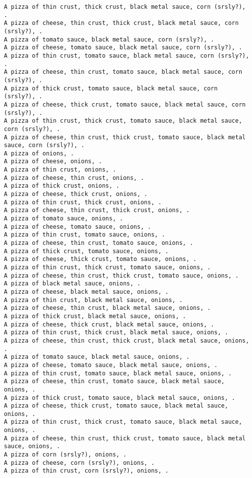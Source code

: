 \documentclass[11pt]{article}
\begin{document}
\begin{enumerate}
\begin{verbatim}
A pizza of thin crust, thick crust, black metal sauce, corn (srsly?), .
A pizza of cheese, thin crust, thick crust, black metal sauce, corn (srsly?), .
A pizza of tomato sauce, black metal sauce, corn (srsly?), .
A pizza of cheese, tomato sauce, black metal sauce, corn (srsly?), .
A pizza of thin crust, tomato sauce, black metal sauce, corn (srsly?), .
A pizza of cheese, thin crust, tomato sauce, black metal sauce, corn (srsly?), .
A pizza of thick crust, tomato sauce, black metal sauce, corn (srsly?), .
A pizza of cheese, thick crust, tomato sauce, black metal sauce, corn (srsly?), .
A pizza of thin crust, thick crust, tomato sauce, black metal sauce, corn (srsly?), .
A pizza of cheese, thin crust, thick crust, tomato sauce, black metal sauce, corn (srsly?), .
A pizza of onions, .
A pizza of cheese, onions, .
A pizza of thin crust, onions, .
A pizza of cheese, thin crust, onions, .
A pizza of thick crust, onions, .
A pizza of cheese, thick crust, onions, .
A pizza of thin crust, thick crust, onions, .
A pizza of cheese, thin crust, thick crust, onions, .
A pizza of tomato sauce, onions, .
A pizza of cheese, tomato sauce, onions, .
A pizza of thin crust, tomato sauce, onions, .
A pizza of cheese, thin crust, tomato sauce, onions, .
A pizza of thick crust, tomato sauce, onions, .
A pizza of cheese, thick crust, tomato sauce, onions, .
A pizza of thin crust, thick crust, tomato sauce, onions, .
A pizza of cheese, thin crust, thick crust, tomato sauce, onions, .
A pizza of black metal sauce, onions, .
A pizza of cheese, black metal sauce, onions, .
A pizza of thin crust, black metal sauce, onions, .
A pizza of cheese, thin crust, black metal sauce, onions, .
A pizza of thick crust, black metal sauce, onions, .
A pizza of cheese, thick crust, black metal sauce, onions, .
A pizza of thin crust, thick crust, black metal sauce, onions, .
A pizza of cheese, thin crust, thick crust, black metal sauce, onions, .
A pizza of tomato sauce, black metal sauce, onions, .
A pizza of cheese, tomato sauce, black metal sauce, onions, .
A pizza of thin crust, tomato sauce, black metal sauce, onions, .
A pizza of cheese, thin crust, tomato sauce, black metal sauce, onions, .
A pizza of thick crust, tomato sauce, black metal sauce, onions, .
A pizza of cheese, thick crust, tomato sauce, black metal sauce, onions, .
A pizza of thin crust, thick crust, tomato sauce, black metal sauce, onions, .
A pizza of cheese, thin crust, thick crust, tomato sauce, black metal sauce, onions, .
A pizza of corn (srsly?), onions, .
A pizza of cheese, corn (srsly?), onions, .
A pizza of thin crust, corn (srsly?), onions, .

\end{verbatim}
\end{enumerate}
\end{document}
